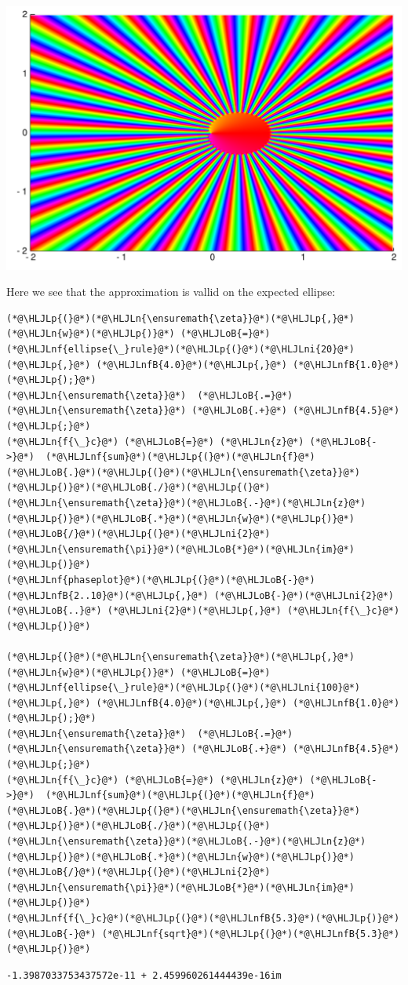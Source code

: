 \documentclass[12pt,a4paper]{article}
\newcommand{\HLJLn}[1]{#1}
\newcommand{\HLJLnf}[1]{\textcolor[RGB]{66,102,213}{#1}}
\newcommand{\HLJLnfB}[1]{\textcolor[RGB]{59,151,46}{#1}}
\newcommand{\HLJLni}[1]{\textcolor[RGB]{59,151,46}{#1}}
\newcommand{\HLJLoB}[1]{\textcolor[RGB]{102,102,102}{\textbf{#1}}}
\newcommand{\HLJLp}[1]{#1}
\begin{document}
\includegraphics[width=\linewidth]{figures/Lecture6_12_1.pdf}

Here we see that the approximation is vallid on the expected ellipse:


\begin{lstlisting}
(*@\HLJLp{(}@*)(*@\HLJLn{\ensuremath{\zeta}}@*)(*@\HLJLp{,}@*) (*@\HLJLn{w}@*)(*@\HLJLp{)}@*) (*@\HLJLoB{=}@*) (*@\HLJLnf{ellipse{\_}rule}@*)(*@\HLJLp{(}@*)(*@\HLJLni{20}@*)(*@\HLJLp{,}@*) (*@\HLJLnfB{4.0}@*)(*@\HLJLp{,}@*) (*@\HLJLnfB{1.0}@*)(*@\HLJLp{);}@*)
(*@\HLJLn{\ensuremath{\zeta}}@*)  (*@\HLJLoB{.=}@*) (*@\HLJLn{\ensuremath{\zeta}}@*) (*@\HLJLoB{.+}@*) (*@\HLJLnfB{4.5}@*)(*@\HLJLp{;}@*)
(*@\HLJLn{f{\_}c}@*) (*@\HLJLoB{=}@*) (*@\HLJLn{z}@*) (*@\HLJLoB{->}@*)  (*@\HLJLnf{sum}@*)(*@\HLJLp{(}@*)(*@\HLJLn{f}@*)(*@\HLJLoB{.}@*)(*@\HLJLp{(}@*)(*@\HLJLn{\ensuremath{\zeta}}@*)(*@\HLJLp{)}@*)(*@\HLJLoB{./}@*)(*@\HLJLp{(}@*)(*@\HLJLn{\ensuremath{\zeta}}@*)(*@\HLJLoB{.-}@*)(*@\HLJLn{z}@*)(*@\HLJLp{)}@*)(*@\HLJLoB{.*}@*)(*@\HLJLn{w}@*)(*@\HLJLp{)}@*)(*@\HLJLoB{/}@*)(*@\HLJLp{(}@*)(*@\HLJLni{2}@*)(*@\HLJLn{\ensuremath{\pi}}@*)(*@\HLJLoB{*}@*)(*@\HLJLn{im}@*)(*@\HLJLp{)}@*)
(*@\HLJLnf{phaseplot}@*)(*@\HLJLp{(}@*)(*@\HLJLoB{-}@*)(*@\HLJLnfB{2..10}@*)(*@\HLJLp{,}@*) (*@\HLJLoB{-}@*)(*@\HLJLni{2}@*) (*@\HLJLoB{..}@*) (*@\HLJLni{2}@*)(*@\HLJLp{,}@*) (*@\HLJLn{f{\_}c}@*)(*@\HLJLp{)}@*)

(*@\HLJLp{(}@*)(*@\HLJLn{\ensuremath{\zeta}}@*)(*@\HLJLp{,}@*) (*@\HLJLn{w}@*)(*@\HLJLp{)}@*) (*@\HLJLoB{=}@*) (*@\HLJLnf{ellipse{\_}rule}@*)(*@\HLJLp{(}@*)(*@\HLJLni{100}@*)(*@\HLJLp{,}@*) (*@\HLJLnfB{4.0}@*)(*@\HLJLp{,}@*) (*@\HLJLnfB{1.0}@*)(*@\HLJLp{);}@*)
(*@\HLJLn{\ensuremath{\zeta}}@*)  (*@\HLJLoB{.=}@*) (*@\HLJLn{\ensuremath{\zeta}}@*) (*@\HLJLoB{.+}@*) (*@\HLJLnfB{4.5}@*)(*@\HLJLp{;}@*)
(*@\HLJLn{f{\_}c}@*) (*@\HLJLoB{=}@*) (*@\HLJLn{z}@*) (*@\HLJLoB{->}@*)  (*@\HLJLnf{sum}@*)(*@\HLJLp{(}@*)(*@\HLJLn{f}@*)(*@\HLJLoB{.}@*)(*@\HLJLp{(}@*)(*@\HLJLn{\ensuremath{\zeta}}@*)(*@\HLJLp{)}@*)(*@\HLJLoB{./}@*)(*@\HLJLp{(}@*)(*@\HLJLn{\ensuremath{\zeta}}@*)(*@\HLJLoB{.-}@*)(*@\HLJLn{z}@*)(*@\HLJLp{)}@*)(*@\HLJLoB{.*}@*)(*@\HLJLn{w}@*)(*@\HLJLp{)}@*)(*@\HLJLoB{/}@*)(*@\HLJLp{(}@*)(*@\HLJLni{2}@*)(*@\HLJLn{\ensuremath{\pi}}@*)(*@\HLJLoB{*}@*)(*@\HLJLn{im}@*)(*@\HLJLp{)}@*)
(*@\HLJLnf{f{\_}c}@*)(*@\HLJLp{(}@*)(*@\HLJLnfB{5.3}@*)(*@\HLJLp{)}@*) (*@\HLJLoB{-}@*) (*@\HLJLnf{sqrt}@*)(*@\HLJLp{(}@*)(*@\HLJLnfB{5.3}@*)(*@\HLJLp{)}@*)
\end{lstlisting}

\begin{lstlisting}
-1.3987033753437572e-11 + 2.459960261444439e-16im
\end{lstlisting}
\end{document}
